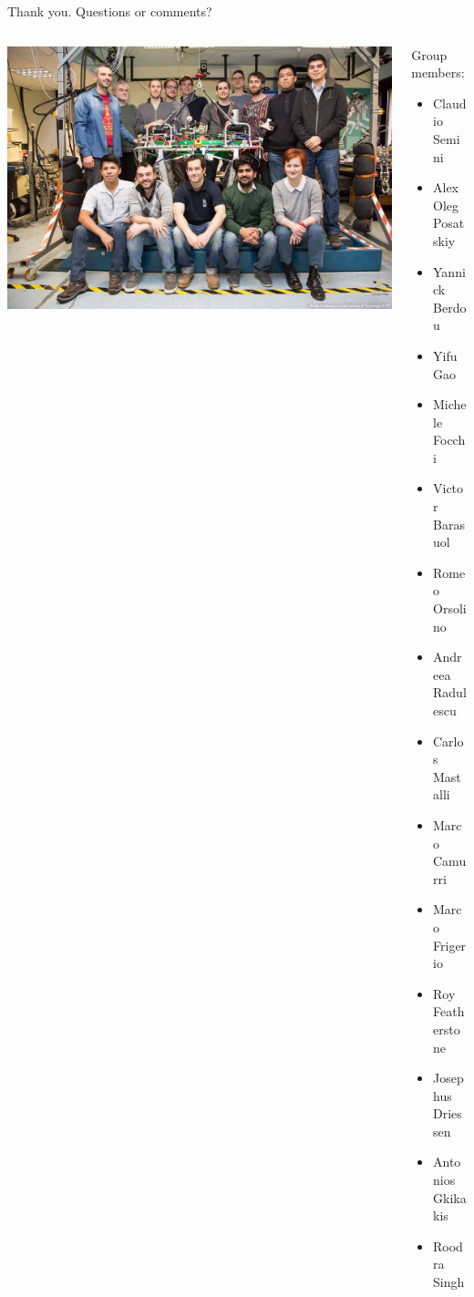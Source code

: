 \documentclass[10pt]{beamer}
\begin{document}
\begin{frame}{Thank you. Questions or comments?}
 \begin{columns}
 \begin{column}{0.7\textwidth}
 \includegraphics[width=1\textwidth]{GroupPicture.jpg}
 \end{column}
 \begin{column}{0.3\textwidth}
 Group members:
 \footnotesize\begin{itemize}\setlength\itemsep{0.07em}
 \item Claudio Semini
 \item Alex Oleg Posatskiy
 \item Yannick Berdou
 \item Yifu Gao
 \item Michele Focchi
 \item Victor Barasuol
 \item Romeo Orsolino
 \item Andreea Radulescu
 \item Carlos Mastalli
 \item Marco Camurri
 \item Marco Frigerio
 \item Roy Featherstone
 \item Josephus Driessen
 \item Antonios Gkikakis
 \item Roodra Singh
 \end{itemize}
 \end{column}
 \end{columns}
\end{frame}
\end{document}
